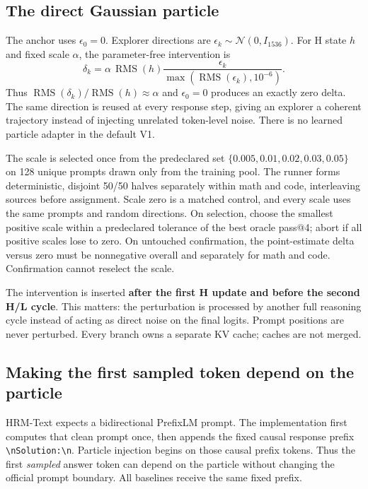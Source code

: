 \documentclass[10pt]{article}
\begin{document}
\subsection*{The direct Gaussian particle}

The anchor uses $\epsilon_0=0$. Explorer directions are
$\epsilon_k\sim\mathcal{N}(0,I_{1536})$. For H state $h$ and fixed scale
$\alpha$, the parameter-free intervention is
\[
 \delta_k=\alpha\,\operatorname{RMS}(h)
 \frac{\epsilon_k}{\max(\operatorname{RMS}(\epsilon_k),10^{-6})}.
\]
Thus $\operatorname{RMS}(\delta_k)/\operatorname{RMS}(h)\approx\alpha$ and
$\epsilon_0=0$ produces an exactly zero delta. The same direction is reused at
every response step, giving an explorer a coherent trajectory instead of
injecting unrelated token-level noise. There is no learned particle adapter in
the default V1.

The scale is selected once from the predeclared set
$\{0.005,0.01,0.02,0.03,0.05\}$ on 128 unique prompts drawn only from the
training pool. The runner forms deterministic, disjoint 50/50 halves
separately within math and code, interleaving sources before assignment. Scale
zero is a matched control, and every scale uses the same prompts and random
directions. On selection, choose the smallest positive scale within a
predeclared tolerance of the best oracle pass@4; abort if all positive scales
lose to zero. On untouched confirmation, the point-estimate delta versus zero
must be nonnegative overall and separately for math and code. Confirmation
cannot reselect the scale.

The intervention is inserted \textbf{after the first H update and before the
second H/L cycle}.  This matters: the perturbation is processed by another full
reasoning cycle instead of acting as direct noise on the final logits.  Prompt
positions are never perturbed.  Every branch owns a separate KV cache; caches
are not merged.

\subsection*{Making the first sampled token depend on the particle}

HRM-Text expects a bidirectional PrefixLM prompt.  The implementation first
computes that clean prompt once, then appends the fixed causal response prefix
\texttt{\textbackslash nSolution:\textbackslash n}.  Particle injection begins
on those causal prefix tokens.  Thus the first \emph{sampled} answer token can
depend on the particle without changing the official prompt boundary.  All
baselines receive the same fixed prefix.
\end{document}
